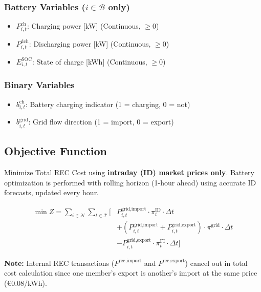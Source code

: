 \documentclass[11pt,a4paper]{article}
\begin{document}
\subsubsection*{Battery Variables ($i \in \mathcal{B}$ only)}
\begin{itemize}
    \item $P_{i,t}^{\text{ch}}$: Charging power [kW] (Continuous, $\geq 0$)
    \item $P_{i,t}^{\text{dch}}$: Discharging power [kW] (Continuous, $\geq 0$)
    \item $E_{i,t}^{\text{SOC}}$: State of charge [kWh] (Continuous, $\geq 0$)
\end{itemize}

\subsubsection*{Binary Variables}
\begin{itemize}
    \item $b_{i,t}^{\text{ch}}$: Battery charging indicator (1 = charging, 0 = not)
    \item $b_{i,t}^{\text{grid}}$: Grid flow direction (1 = import, 0 = export)
\end{itemize}

\subsection{Objective Function}

Minimize Total REC Cost using \textbf{intraday (ID) market prices only}. Battery optimization is performed with rolling horizon (1-hour ahead) using accurate ID forecasts, updated every hour.

\begin{equation}
\begin{split}
\min Z = \sum_{i \in \mathcal{N}} \sum_{t \in \mathcal{T}} \Big[
    &P_{i,t}^{\text{grid,import}} \cdot \pi_t^{\text{ID}} \cdot \Delta t \\
    &+ (P_{i,t}^{\text{grid,import}} + P_{i,t}^{\text{grid,export}}) \cdot \pi^{\text{grid}} \cdot \Delta t \\
    &- P_{i,t}^{\text{grid,export}} \cdot \pi_t^{\text{FI}} \cdot \Delta t
\Big]
\end{split}
\end{equation}

\textbf{Note:} Internal REC transactions ($P^{\text{rec,import}}$ and $P^{\text{rec,export}}$) cancel out in total cost calculation since one member's export is another's import at the same price (€0.08/kWh).
\end{document}
